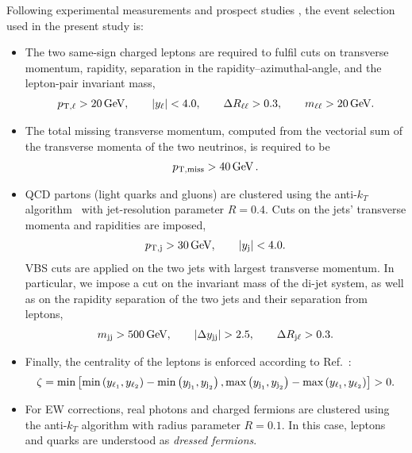 \documentclass[11pt,epsf]{article}
\begin{document}
    Following experimental measurements \cite{Aad:2014zda,Aaboud:2016ffv,Khachatryan:2014sta,CMS:2017adb} and prospect studies \cite{ATL-PHYS-PUB-2017-023}, the event selection used in the present study is:

    \begin{itemize}
        \item The two same-sign charged leptons are required to fulfil
          cuts on transverse momentum, rapidity, separation in the
          rapidity--azimuthal-angle, and the lepton-pair invariant mass, 
            \begin{align}
            \label{cut:1}
             p_{\text{T},\ell} >  20\,\text{GeV},\qquad |y_{\ell}| < 4.0, \qquad \Delta R_{\ell\ell}> 0.3, \qquad m_{\ell\ell}>20\,\text{GeV}.
            \end{align}
        \item The total missing transverse momentum, computed from the vectorial sum of the transverse momenta of the two neutrinos, is required to be
            \begin{align}
            \label{cut:2}
              p_{\rm T, miss} >  40\,\text{GeV}\,.
            \end{align}
        \item QCD partons (light quarks and gluons) are clustered  using the anti-$k_T$ algorithm~\cite{Cacciari:2008gp} with jet-resolution parameter $R=0.4$.
        Cuts on the jets' transverse momenta and rapidities are imposed,  
            \begin{align}
            \label{cut:3}
             p_{\text{T},\text{j}} >  30\,\text{GeV}, \qquad |y_\text{j}| < 4.0. 
            \end{align}
            VBS cuts are applied on the two jets with largest transverse momentum. In particular, we impose a cut on the 
             in\-vari\-ant mass of the di-jet system, as well as on the rapidity separation of the two jets and their separation from leptons,
            \begin{align}
            \label{cut:4}
             m_{\text{j} \text{j}} >  500\,\text{GeV},\qquad |\Delta y_{\text{j} \text{j}}| > 2.5, \qquad \Delta R_{\text{j}\ell} > 0.3 .
            \end{align}
        \item Finally, the centrality of the leptons is enforced according to Ref.~\cite{ATL-PHYS-PUB-2017-023}:
            \begin{align}
            \label{cut:5}
             \zeta = \text{min}\left[\text{min}\left(y_{\ell_1},y_{\ell_2}\right) - \text{min}\left(y_{\text{j}_1},y_{\text{j}_2}\right), \text{max}\left(y_{\text{j}_1},y_{\text{j}_2}\right) - \text{max}\left(y_{\ell_1},y_{\ell_2}\right)\right]> 0 .
            \end{align}
            
        \item For EW corrections, real photons and charged fermions are clustered using the anti-$k_T$ algorithm with
            radius parameter $R=0.1$. In this case, leptons and quarks are understood as {\it dressed fermions}.
    \end{itemize}
\end{document}
